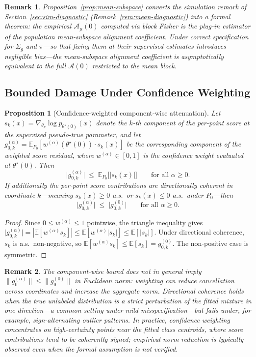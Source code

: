 \documentclass[11pt]{article}
\newtheorem{proposition}{Proposition}
\newtheorem{remark}{Remark}
\theoremstyle{definition}
\newcommand{\E}{\mathbb{E}}
\newcommand{\Sig}{\Sigma}
\newcommand{\calA}{\mathcal{A}}
\begin{document}
\begin{remark}
Proposition~\ref{prop:mean-subspace} converts the simulation remark of
Section~\ref{sec:sim-diagnostic} (Remark~\ref{rem:mean-diagnostic}) into
a formal theorem: the empirical \(\calA_\mu(0)\) computed via block Fisher
is the plug-in estimator of the population mean-subspace alignment coefficient.
Under correct specification for \(\Sig_g\) and \(\pi\)---so that fixing
them at their supervised estimates introduces negligible bias---the
mean-subspace alignment coefficient is asymptotically equivalent to the
full \(\calA(0)\) restricted to the mean block.
\end{remark}

\subsection{Bounded Damage Under Confidence Weighting}

\begin{proposition}[Confidence-weighted component-wise attenuation]
\label{prop:conf-safety}
Let \(s_k(x) = \nabla_{\theta_k}\log p_{\theta^\star(0)}(x)\) denote
the \(k\)-th component of the per-point score at the supervised
pseudo-true parameter, and let
\(g_{0,k}^{(\alpha)} = \E_{P_0}[w^{(\alpha)}(\theta^\star(0))\cdot s_k(x)]\)
be the corresponding component of the weighted score residual,
where \(w^{(\alpha)}\in[0,1]\) is the confidence weight evaluated at \(\theta^\star(0)\).
Then
\[
\bigl|g_{0,k}^{(\alpha)}\bigr| \;\leq\; \E_{P_0}\!\bigl[|s_k(x)|\bigr]
\qquad\text{for all }\alpha\geq 0.
\]
If additionally the per-point score contributions are directionally coherent
in coordinate \(k\)---meaning \(s_k(x)\geq 0\) a.s.\ or \(s_k(x)\leq 0\) a.s.\
under \(P_0\)---then
\[
\bigl|g_{0,k}^{(\alpha)}\bigr| \;\leq\; \bigl|g_{0,k}^{(0)}\bigr|
\qquad\text{for all }\alpha\geq 0.
\]
\end{proposition}

\begin{proof}
Since \(0\leq w^{(\alpha)}\leq 1\) pointwise, the triangle inequality gives
\(\bigl|g_{0,k}^{(\alpha)}\bigr|
= |\E[w^{(\alpha)}s_k]|
\leq \E[w^{(\alpha)}|s_k|]
\leq \E[|s_k|]\).
Under directional coherence, \(s_k\) is a.s.\ non-negative,
so \(\E[w^{(\alpha)}s_k]\leq \E[s_k] = g_{0,k}^{(0)}\).
The non-positive case is symmetric.
\end{proof}

\begin{remark}
The component-wise bound does not in general imply
\(\|g_0^{(\alpha)}\|\leq\|g_0^{(0)}\|\) in Euclidean norm:
weighting can reduce cancellation across coordinates and increase
the aggregate norm.
Directional coherence holds when the true unlabeled distribution is a
strict perturbation of the fitted mixture in one direction---a common
setting under mild misspecification---but fails under, for example,
sign-alternating outlier patterns.
In practice, confidence weighting concentrates on high-certainty points
near the fitted class centroids, where score contributions tend to be
coherently signed; empirical norm reduction is typically observed even
when the formal assumption is not verified.
\end{remark}
\end{document}
